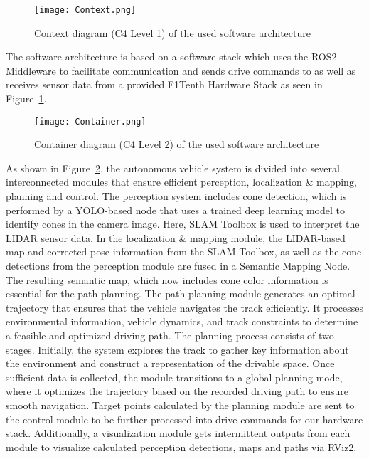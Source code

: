\begin{figure}[H]
\begin{center}
\centerline{\texttt{[image: Context.png]}}
\caption{Context diagram (C4 Level 1) of the used software architecture}
\label{fig:arch-context}
\end{center}
\end{figure}
The software architecture is based on a software stack which uses the ROS2 Middleware to facilitate communication and sends drive commands to as well as receives sensor data from a provided F1Tenth Hardware Stack as seen in Figure~\ref{fig:arch-context}.
\begin{figure}[H]
\begin{center}
\centerline{\texttt{[image: Container.png]}}
\caption{Container diagram (C4 Level 2) of the used software architecture}
\label{fig:arch-container}
\end{center}
\end{figure}
As shown in Figure~\ref{fig:arch-container}, the autonomous vehicle system is divided into several interconnected modules that ensure efficient perception, localization \& mapping, planning and control. 
The perception system includes cone detection, which is performed by a YOLO-based node that uses a trained deep learning model to identify cones in the camera image.
Here, SLAM Toolbox is used to interpret the LIDAR sensor data.
\newline
In the localization \& mapping module, the LIDAR-based map and corrected pose information from the SLAM Toolbox, as well as the cone detections from the perception module are fused in a Semantic Mapping Node. The resulting semantic map, which now includes cone color information is essential for the path planning. 
\newline
The path planning module generates an optimal trajectory that ensures that the vehicle navigates the track efficiently. It processes environmental information, vehicle dynamics, and track constraints to determine a feasible and optimized driving path.
The planning process consists of two stages. Initially, the system explores the track to gather key information about the environment and construct a representation of the drivable space. Once sufficient data is collected, the module transitions to a global planning mode, where it optimizes the trajectory based on the recorded driving path to ensure smooth navigation.
\newline
Target points calculated by the planning module are sent to the control module to be further processed into drive commands for our hardware stack.
\newline
Additionally, a visualization module gets intermittent outputs from each module to visualize calculated perception detections, maps and paths via RViz2.\\